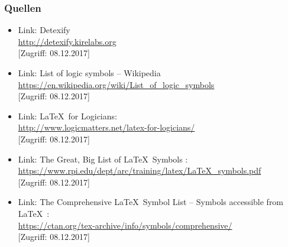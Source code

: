 \documentclass[a4paper,10pt, bibtotoc]{beamer}
\begin{document}
\begin{frame}[allowframebreaks]
\frametitle{Quellen}

{\footnotesize
	
	\begin{itemize}
		
%		

		\item Link: Detexify\\ 
		\url{http://detexify.kirelabs.org}\\
		{[}Zugriff: 08.12.2017]		

		\item Link: List of logic symbols -- Wikipedia\\ 
		\url{https://en.wikipedia.org/wiki/List_of_logic_symbols}\\
		{[}Zugriff: 08.12.2017]		
		
		\item Link: \LaTeX\ for Logicians:\\		
		\url{http://www.logicmatters.net/latex-for-logicians/}\\
		{[}Zugriff: 08.12.2017]				
		
		
		\item Link: The Great, Big List of \LaTeX\ Symbols \citep{Carlisle&Co01a}:\\
		\url{https://www.rpi.edu/dept/arc/training/latex/LaTeX_symbols.pdf}\\
		{[}Zugriff: 08.12.2017]		
				
		\item Link: The Comprehensive \LaTeX\ Symbol List -- Symbols accessible from \LaTeX\ \citep{Pakin17a}:\\
		\url{https://ctan.org/tex-archive/info/symbols/comprehensive/}\\
		{[}Zugriff: 08.12.2017]				



\end{itemize}}
\end{frame}
\end{document}
